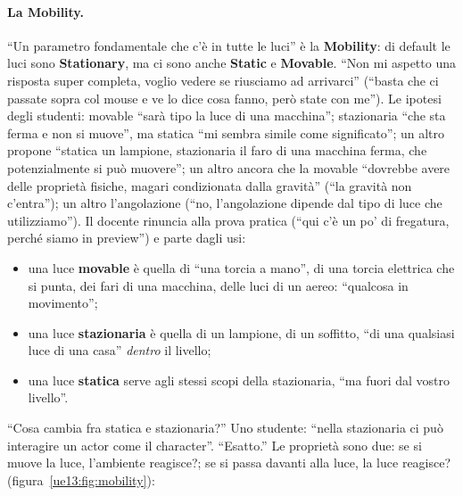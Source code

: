 \paragraph{La Mobility.} ``Un parametro fondamentale che c'è in tutte le luci'' è la
\textbf{Mobility}: di default le luci sono \textbf{Stationary}, ma ci sono anche
\textbf{Static} e \textbf{Movable}. ``Non mi aspetto una risposta super completa, voglio
vedere se riusciamo ad arrivarci'' (``basta che ci passate sopra col mouse e ve lo dice
cosa fanno, però state con me''). Le ipotesi degli studenti: movable ``sarà tipo la luce di
una macchina''; stazionaria ``che sta ferma e non si muove'', ma statica ``mi sembra simile
come significato''; un altro propone ``statica un lampione, stazionaria il faro di una
macchina ferma, che potenzialmente si può muovere''; un altro ancora che la movable
``dovrebbe avere delle proprietà fisiche, magari condizionata dalla gravità'' (``la gravità
non c'entra''); un altro l'angolazione (``no, l'angolazione dipende dal tipo di luce che
utilizziamo''). Il docente rinuncia alla prova pratica (``qui c'è un po' di fregatura,
perché siamo in preview'') e parte dagli usi:
\begin{itemize}
  \item una luce \textbf{movable} è quella di ``una torcia a mano'', di una torcia
        elettrica che si punta, dei fari di una macchina, delle luci di un aereo: ``qualcosa
        in movimento'';
  \item una luce \textbf{stazionaria} è quella di un lampione, di un soffitto, ``di una
        qualsiasi luce di una casa'' \emph{dentro} il livello;
  \item una luce \textbf{statica} serve agli stessi scopi della stazionaria, ``ma fuori dal
        vostro livello''.
\end{itemize}
``Cosa cambia fra statica e stazionaria?'' Uno studente: ``nella stazionaria ci può
interagire un actor come il character''. ``Esatto.'' Le proprietà sono due: se si muove la
luce, l'ambiente reagisce?; se si passa davanti alla luce, la luce reagisce?
(figura~\ref{ue13:fig:mobility}):
